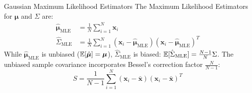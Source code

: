 \begin{theorembox}{Gaussian Maximum Likelihood Estimators}
The Maximum Likelihood Estimators for $\boldsymbol{\mu}$ and $\Sigma$ are:
\begin{align}
\hat{\boldsymbol{\mu}}_{\text{MLE}} &= \frac{1}{N} \sum_{i=1}^N \mathbf{x}_i \label{eq:mle_mu} \\
\hat{\Sigma}_{\text{MLE}} &= \frac{1}{N} \sum_{i=1}^N (\mathbf{x}_i - \hat{\boldsymbol{\mu}}_{\text{MLE}})(\mathbf{x}_i - \hat{\boldsymbol{\mu}}_{\text{MLE}})^T \label{eq:mle_sigma}
\end{align}
While $\hat{\boldsymbol{\mu}}_{\text{MLE}}$ is unbiased ($\operatorname{\mathbb{E}}[\hat{\boldsymbol{\mu}}] = \boldsymbol{\mu}$), $\hat{\Sigma}_{\text{MLE}}$ is biased: $\operatorname{\mathbb{E}}[\hat{\Sigma}_{\text{MLE}}] = \frac{N-1}{N}\Sigma$. The unbiased sample covariance incorporates Bessel's correction factor $\frac{N}{N-1}$:
\begin{equation}
S = \frac{1}{N-1} \sum_{i=1}^N (\mathbf{x}_i - \bar{\mathbf{x}})(\mathbf{x}_i - \bar{\mathbf{x}})^T
\end{equation}
\end{theorembox}

